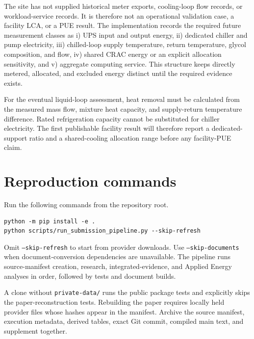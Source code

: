\documentclass[review,12pt]{elsarticle}
\begin{document}
The site has not supplied historical meter exports, cooling-loop flow records, or workload-service records. It is therefore not an operational validation case, a facility LCA, or a PUE result. The implementation records the required future measurement classes as i) UPS input and output energy, ii) dedicated chiller and pump electricity, iii) chilled-loop supply temperature, return temperature, glycol composition, and flow, iv) shared CRAC energy or an explicit allocation sensitivity, and v) aggregate computing service. This structure keeps directly metered, allocated, and excluded energy distinct until the required evidence exists.

For the eventual liquid-loop assessment, heat removal must be calculated from the measured mass flow, mixture heat capacity, and supply-return temperature difference. Rated refrigeration capacity cannot be substituted for chiller electricity. The first publishable facility result will therefore report a dedicated-support ratio and a shared-cooling allocation range before any facility-PUE claim.

\section{Reproduction commands}
Run the following commands from the repository root.

\begin{verbatim}
python -m pip install -e .
python scripts/run_submission_pipeline.py --skip-refresh
\end{verbatim}

Omit \texttt{--skip-refresh} to start from provider downloads. Use \texttt{--skip-documents} when document-conversion dependencies are unavailable. The pipeline runs source-manifest creation, research, integrated-evidence, and Applied Energy analyses in order, followed by tests and document builds.

A clone without \texttt{private-data/} runs the public package tests and explicitly skips the paper-reconstruction tests. Rebuilding the paper requires locally held provider files whose hashes appear in the manifest. Archive the source manifest, execution metadata, derived tables, exact Git commit, compiled main text, and supplement together.
\end{document}
